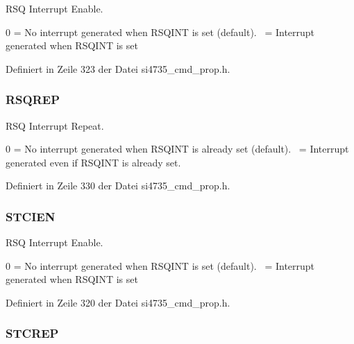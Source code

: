 R\+S\+Q Interrupt Enable. 

0 = No interrupt generated when R\+S\+Q\+I\+N\+T is set (default).~ = Interrupt generated when R\+S\+Q\+I\+N\+T is set 

Definiert in Zeile 323 der Datei si4735\+\_\+cmd\+\_\+prop.\+h.

\hypertarget{uniongpo__ien_aabc41880837bbe6b1716b6708f4d5c8c}{}
\subsubsection[{R\+S\+Q\+R\+E\+P}]{\setlength{\rightskip}{0pt plus 5cm}R\+S\+Q\+R\+E\+P}\label{uniongpo__ien_aabc41880837bbe6b1716b6708f4d5c8c}


R\+S\+Q Interrupt Repeat. 

0 = No interrupt generated when R\+S\+Q\+I\+N\+T is already set (default).~ = Interrupt generated even if R\+S\+Q\+I\+N\+T is already set. 

Definiert in Zeile 330 der Datei si4735\+\_\+cmd\+\_\+prop.\+h.

\hypertarget{uniongpo__ien_ad9adfb2ddca813d59dcc9361db43dcb3}{}
\subsubsection[{S\+T\+C\+I\+E\+N}]{\setlength{\rightskip}{0pt plus 5cm}S\+T\+C\+I\+E\+N}\label{uniongpo__ien_ad9adfb2ddca813d59dcc9361db43dcb3}


R\+S\+Q Interrupt Enable. 

0 = No interrupt generated when R\+S\+Q\+I\+N\+T is set (default).~ = Interrupt generated when R\+S\+Q\+I\+N\+T is set 

Definiert in Zeile 320 der Datei si4735\+\_\+cmd\+\_\+prop.\+h.

\hypertarget{uniongpo__ien_a8a57a750de6cf1d2805c1c6895208811}{}
\subsubsection[{S\+T\+C\+R\+E\+P}]{\setlength{\rightskip}{0pt plus 5cm}S\+T\+C\+R\+E\+P}\label{uniongpo__ien_a8a57a750de6cf1d2805c1c6895208811}


